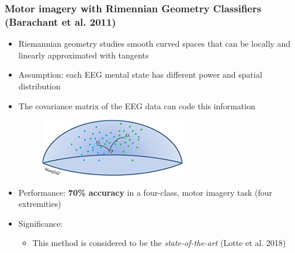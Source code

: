 \documentclass{beamer}
\begin{document}
\begin{frame}
	\frametitle{Motor imagery with Rimennian Geometry Classifiers (Barachant et al. 2011)}
	
	\begin{itemize}

		\item Riemannian geometry studies smooth curved spaces that can be locally and linearly approximated with tangents
		
		\item Assumption: each EEG mental state has different power and spatial distribution

		\item The covariance matrix of the EEG data can code this information
		\begin{figure}
			\centering
			\includegraphics[scale=1.0]{fig8.jpg}
		\end{figure}

		\item Performance: \textbf{70\% accuracy} in a four-class, motor imagery task (four extremities)

		\item Significance: 
		\begin{itemize}
			\item This method is considered to be the \textit{state-of-the-art} (Lotte et al. 2018)
		\end{itemize}	

	\end{itemize}

\end{frame}
\end{document}
